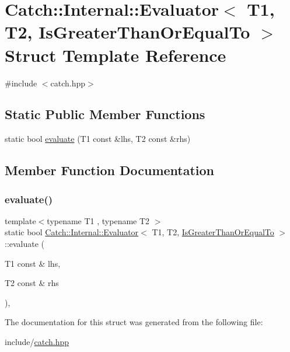 \hypertarget{struct_catch_1_1_internal_1_1_evaluator_3_01_t1_00_01_t2_00_01_is_greater_than_or_equal_to_01_4}{}\section{Catch\+:\+:Internal\+:\+:Evaluator$<$ T1, T2, Is\+Greater\+Than\+Or\+Equal\+To $>$ Struct Template Reference}
\label{struct_catch_1_1_internal_1_1_evaluator_3_01_t1_00_01_t2_00_01_is_greater_than_or_equal_to_01_4}


{\ttfamily \#include $<$catch.\+hpp$>$}

\subsection*{Static Public Member Functions}
\begin{DoxyCompactItemize}
\item 
static bool \mbox{\hyperlink{struct_catch_1_1_internal_1_1_evaluator_3_01_t1_00_01_t2_00_01_is_greater_than_or_equal_to_01_4_a5ba107c6da4292b6492a0e5e906f9484}{evaluate}} (T1 const \&lhs, T2 const \&rhs)
\end{DoxyCompactItemize}


\subsection{Member Function Documentation}
\mbox{\label{struct_catch_1_1_internal_1_1_evaluator_3_01_t1_00_01_t2_00_01_is_greater_than_or_equal_to_01_4_a5ba107c6da4292b6492a0e5e906f9484}} 
\subsubsection{\texorpdfstring{evaluate()}{evaluate()}}
{\footnotesize\ttfamily template$<$typename T1 , typename T2 $>$ \\
static bool \mbox{\hyperlink{class_catch_1_1_internal_1_1_evaluator}{Catch\+::\+Internal\+::\+Evaluator}}$<$ T1, T2, \mbox{\hyperlink{namespace_catch_1_1_internal_ae3f96598a7858155750bf38e7295d83ead2de7e9565e59e36c0987e402203ce1c}{Is\+Greater\+Than\+Or\+Equal\+To}} $>$\+::evaluate (\begin{DoxyParamCaption}\item[{T1 const \&}]{lhs,  }\item[{T2 const \&}]{rhs }\end{DoxyParamCaption})\hspace{0.3cm}{\ttfamily [inline]}, {\ttfamily [static]}}



The documentation for this struct was generated from the following file\+:\begin{DoxyCompactItemize}
\item 
include/\mbox{\hyperlink{catch_8hpp}{catch.\+hpp}}\end{DoxyCompactItemize}
